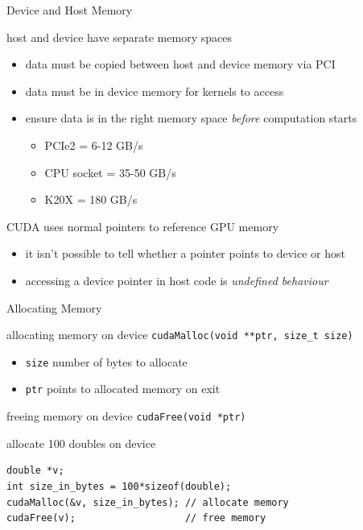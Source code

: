 \documentclass[aspectratio=43]{beamer}
\newcommand{\lst}[1]{\lstinline!#1!}
\begin{document}
\begin{frame}[fragile]{Device and Host Memory}
    \begin{info}{host and device have separate memory spaces}
        \begin{itemize}
            \item data must be copied between host and device memory via PCI
            \item data must be in device memory for kernels to access
            \item ensure data is in the right memory space \emph{before} computation starts
                \begin{itemize}
                    \item PCIe2 = 6-12 GB/s
                    \item CPU socket = 35-50 GB/s
                    \item K20X  = 180 GB/s
                \end{itemize}
        \end{itemize}
    \end{info}

    \begin{info}{CUDA uses normal pointers to reference GPU memory}
        \begin{itemize}
            \item it isn't possible to tell whether a pointer points to device or host
            \item accessing a device pointer in host code is \emph{undefined behaviour}
        \end{itemize}
    \end{info}

\end{frame}

\begin{frame}[fragile]{Allocating Memory}

    \begin{info}{allocating memory on device}
        \centering \lst{cudaMalloc(void **ptr, size_t size)}
    \begin{itemize}
        \item \lst{size} number of bytes to allocate
        \item \lst{ptr} points to allocated memory on exit
    \end{itemize}
    \end{info}

    \begin{info}{freeing memory on device}
        \centering \lst{cudaFree(void *ptr)}
    \end{info}

    \begin{code}{allocate 100 doubles on device}
        \begin{lstlisting}[style=boxcuda]
double *v;
int size_in_bytes = 100*sizeof(double);
cudaMalloc(&v, size_in_bytes); // allocate memory
cudaFree(v);                   // free memory
\end{lstlisting}
    \end{code}
\end{frame}
\end{document}
